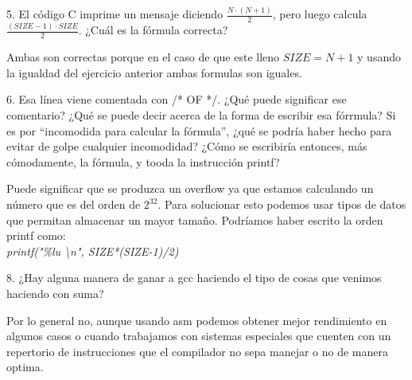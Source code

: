 \begin{ejercicio}{5. El código C imprime un mensaje diciendo
    $\frac{N\cdot (N+1)}{2}$, pero luego calcula $\frac{(SIZE-1)\cdot
      SIZE}{2}$. ¿Cuál es la fórmula correcta?}

  Ambas son correctas porque en el caso de que este lleno $SIZE = N+1$
  y usando la igualdad del ejercicio anterior ambas formulas son
  iguales.
  
\end{ejercicio}

\newpage

\begin{ejercicio}{6. Esa línea viene comentada con /* OF */. ¿Qué
    puede significar ese comentario?  ¿Qué se puede decir acerca
    de la forma de escribir esa fórrmula? Si es por ``incomodida
    para calcular la fórmula'', ¿qué se podría haber hecho para evitar
    de golpe cualquier incomodidad? ¿Cómo se escribiría
    entonces, más cómodamente, la fórmula, y tooda la instrucción
    printf?}

  Puede significar que se produzca un overflow ya que estamos
  calculando un número que es del orden de $2^{32}$. Para solucionar
  esto podemos usar tipos de datos que permitan almacenar un mayor
  tamaño. Podríamos haber escrito la orden printf como:\\

  \textit{printf("\%lu \textbackslash n", SIZE*(SIZE-1)/2)}
  
\end{ejercicio}

\begin{ejercicio}{8. ¿Hay alguna manera de ganar a gcc haciendo el
    tipo de cosas que venimos haciendo con suma?}

  Por lo general no, aunque usando asm podemos obtener mejor
  rendimiento en algunos casos o cuando trabajamos con sistemas
  especiales que cuenten con un repertorio de instrucciones que el
  compilador no sepa manejar o no de manera optima.
\end{ejercicio}